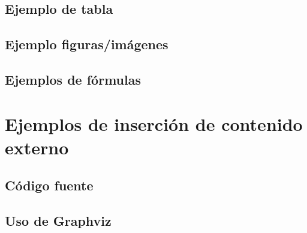 

\newpage
\subsection{Ejemplo de tabla}


\newpage
\subsection{Ejemplo figuras/imágenes}


\subsection{Ejemplos de fórmulas}


\section{Ejemplos de inserción de contenido externo}

\subsection{Código fuente}


\subsection{Uso de Graphviz}
